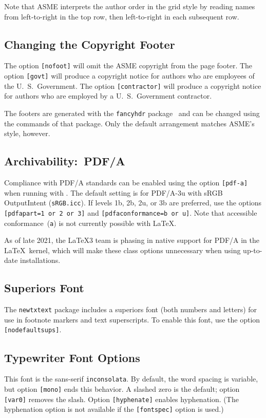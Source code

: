 \documentclass[balance,upint,subscriptcorrection,varvw,mathalfa=cal=boondoxo,spanish,french,vietnamese,russian,greek,pdf-a,colorlinks]{asmeconf}
\begin{document}
Note that ASME interprets the author order in the grid style by reading names from left-to-right in the top row, then left-to-right in each subsequent row.

\subsection{Changing the Copyright Footer} The option \texttt{[nofoot]} will omit the ASME copyright from the page footer. The option \texttt{[govt]} will produce a copyright notice for authors who are employees of the U.\ S.\ Government.  The option \texttt{[contractor]} will produce a copyright
notice for authors who are employed by a U.\ S.\ Government contractor.

The footers are generated with the \texttt{fancyhdr} package~\cite{oostrum} and can be changed using the commands of that package. Only the default arrangement matches ASME's style, however.

\subsection{Archivability:~PDF/A} Compliance with PDF/A standards can be enabled using the option \texttt{[pdf-a]} 
when running with . The default setting is for PDF/A-3u with sRGB OutputIntent (\texttt{sRGB.icc}). 
If levels 1b, 2b, 2u, or 3b are preferred, use the options \texttt{[pdfapart=1 or 2 or 3]} and 
\texttt{[pdfaconformance=b or u]}. Note that accessible conformance~(\texttt{a}) is not currently possible with \LaTeX.

As of late 2021, the \LaTeX 3 team is phasing in native support for PDF/A in the \LaTeX\ kernel, which will make these
class options unnecessary when using up-to-date installations.

\subsection{Superiors Font} The \texttt{newtxtext} package includes a superiors font (both numbers and letters) for use in footnote markers and text superscripts. To enable this font, use the option \texttt{[nodefaultsups]}. 

\subsection{Typewriter Font Options} This font is the sans-serif \texttt{inconsolata}. By default, the word spacing is variable, but option \texttt{[mono]} ends this behavior. A slashed zero is the default; option \texttt{[var0]} removes the slash. Option \texttt{[hyphenate]} enables hyphenation. (The hyphenation option is not available if the \texttt{[fontspec]} option is used.)
\end{document}
